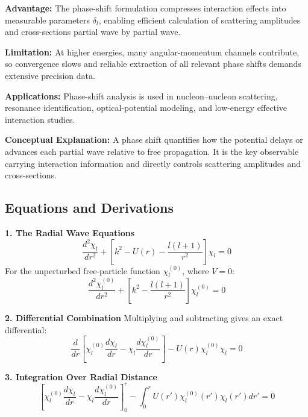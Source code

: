 \documentclass[12pt]{report}
\begin{document}
\textbf{Advantage:} The phase-shift formulation compresses interaction effects into measurable parameters $\delta_l$, enabling efficient calculation of scattering amplitudes and cross-sections partial wave by partial wave.

\textbf{Limitation:} At higher energies, many angular-momentum channels contribute, so convergence slows and reliable extraction of all relevant phase shifts demands extensive precision data.

\textbf{Applications:} Phase-shift analysis is used in nucleon--nucleon scattering, resonance identification, optical-potential modeling, and low-energy effective interaction studies.

\textbf{Conceptual Explanation:} A phase shift quantifies how the potential delays or advances each partial wave relative to free propagation. It is the key observable carrying interaction information and directly controls scattering amplitudes and cross-sections.


\begin{figure}[H]
    \centering
    
\end{figure}

\subsection*{Equations and Derivations}

\textbf{1. The Radial Wave Equations}
\begin{equation}
\frac{d^2\chi_l}{dr^2} + \left[ k^2 - U(r) - \frac{l(l+1)}{r^2} \right] \chi_l = 0
\end{equation}
For the unperturbed free-particle function $\chi_l^{(0)}$, where $V=0$:
\begin{equation}
\frac{d^2\chi_l^{(0)}}{dr^2} + \left[ k^2 - \frac{l(l+1)}{r^2} \right] \chi_l^{(0)} = 0
\end{equation}

\textbf{2. Differential Combination} Multiplying and subtracting gives an exact differential:
\begin{equation}
\frac{d}{dr} \left[ \chi_l^{(0)} \frac{d\chi_l}{dr} - \chi_l \frac{d\chi_l^{(0)}}{dr} \right] - U(r) \chi_l^{(0)} \chi_l = 0
\end{equation}

\textbf{3. Integration Over Radial Distance}
\begin{equation}
\left[ \chi_l^{(0)} \frac{d\chi_l}{dr} - \chi_l \frac{d\chi_l^{(0)}}{dr} \right]_0^r - \int_0^r U(r') \chi_l^{(0)}(r') \chi_l(r') dr' = 0
\end{equation}
\end{document}
